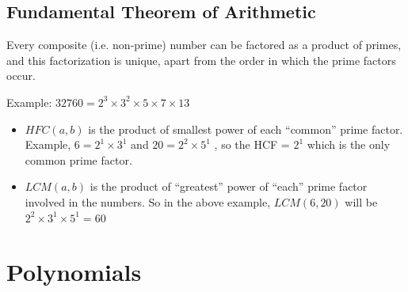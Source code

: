 \documentclass{book}
\begin{document}
	\section{Fundamental Theorem of Arithmetic}
	\begin{mdframed}[backgroundcolor=yellow]
		Every composite (i.e. non-prime) number can be factored as a product of primes, and this factorization is unique, apart from the order in which the prime factors occur.
	\end{mdframed}
	Example:  $32760 = 2^3 \times 3^2 \times 5 \times 7 \times 13$ \\
	\begin{itemize}
		\item $HFC(a,b)$  is the product of smallest power of each “common” prime factor. Example, $6 = 2^1 \times 3^1$ and $20 = 2^2 \times 5^1$ , so the HCF = $2^1$ which is the only common prime factor.
		\item $LCM(a,b)$ is the product of “greatest” power of “each” prime factor involved in the numbers. So in the above example, $LCM(6,20)$ will be $2^2 \times 3^1 \times 5^1 = 60$
	\end{itemize}

	\chapter{Polynomials}	
	
\end{document}
